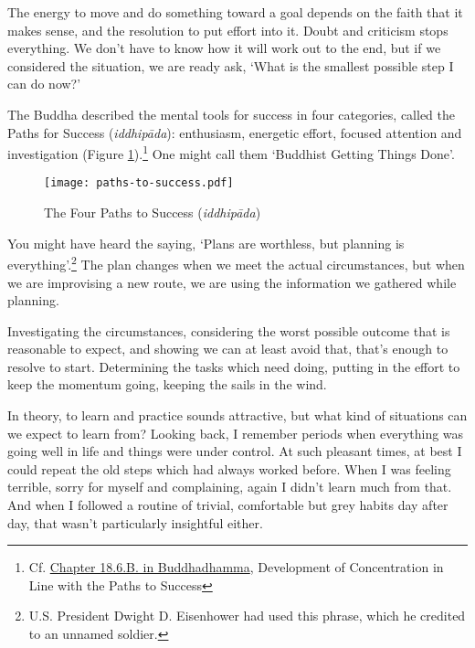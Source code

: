 
The energy to move and do something toward a goal depends on the faith
that it makes sense, and the resolution to put effort into it. Doubt and
criticism stops everything. We don't have to know how it will work out
to the end, but if we considered the situation, we are ready ask, `What
is the smallest possible step I can do now?'

The Buddha described the mental tools for success in four categories,
called the Paths for Success (\emph{iddhipāda}): enthusiasm, energetic
effort, focused attention and investigation (Figure
\ref{fig-success}).\footnote{Cf.
  \href{https://buddhadhamma.github.io/path-factors-of-concentration.html\#development-of-concentration-in-line-with-the-paths-to-success}{Chapter
  18.6.B. in Buddhadhamma}, Development of Concentration in Line with
  the Paths to Success} One might call them `Buddhist Getting Things
Done'.

\clearpage
\null\vfill

\begin{figure}[h]
\caption{The Four Paths to Success (\emph{iddhipāda})}\label{fig-success}

\centering

\texttt{[image: paths-to-success.pdf]}

\end{figure}

\vfill\null
\clearpage


You might have heard the saying, `Plans are worthless, but planning is
everything'.\footnote{U.S. President Dwight D. Eisenhower had used this
  phrase, which he credited to an unnamed soldier.} The plan changes
when we meet the actual circumstances, but when we are improvising a new
route, we are using the information we gathered while planning.

Investigating the circumstances, considering the worst possible outcome
that is reasonable to expect, and showing we can at least avoid that,
that's enough to resolve to start. Determining the tasks which need
doing, putting in the effort to keep the momentum going, keeping the
sails in the wind.

In theory, to learn and practice sounds attractive, but what kind of
situations can we expect to learn from? Looking back, I remember periods
when everything was going well in life and things were under control. At
such pleasant times, at best I could repeat the old steps which had
always worked before. When I was feeling terrible, sorry for myself and
complaining, again I didn't learn much from that. And when I followed a
routine of trivial, comfortable but grey habits day after day, that
wasn't particularly insightful either.

